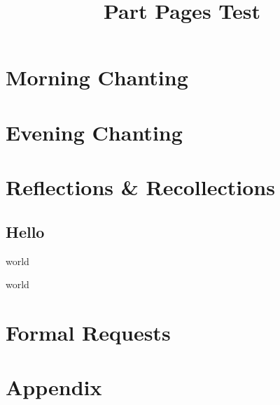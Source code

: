 \documentclass[
  babelLanguage=english,
  final,
]{chantingbook}
\title{Part Pages Test}
\begin{document}
\mainmatter

\part{Morning Chanting}

\part{Evening Chanting}

\part{Reflections \& Recollections}

\chapter{Hello}

world

\clearpage

world

\part{Formal Requests}

\part{Appendix}
\end{document}
